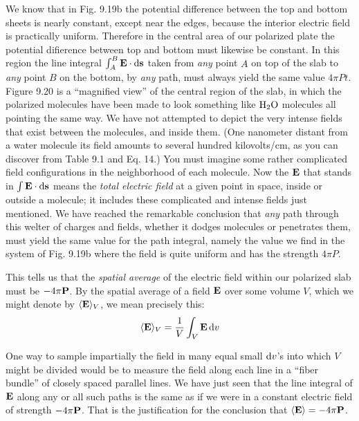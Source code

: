 We know that in Fig. 9.19b the potential difference between the
top and bottom sheets is nearly constant, except near the edges, because
the interior electric field is practically uniform. Therefore in
the central area of our polarized plate the potential difierence between
top and bottom must likewise be constant. In this region the
line integral $\int_A^B\mathbf{E}\cdot\operatorname{d\!}\mathbf{s}$ taken from \emph{any} point $A$ on top of the slab to
\emph{any} point $B$ on the bottom, by \emph{any} path, must always yield the same
value $4\pi Pt$. Figure 9.20 is a ``magnified view'' of the central region
of the slab, in which the polarized molecules have been made to look
something like $\textup{H}_2\textup{O}$ molecules all pointing the same way. We have
not attempted to depict the very intense fields that exist between the
molecules, and inside them. (One nanometer distant from a water
molecule its field amounts to several hundred kilovolts/cm, as you
can discover from Table 9.1 and Eq. 14.) You must imagine some
rather complicated field configurations in the neighborhood of each
molecule. Now the $\mathbf{E}$ that stands in $\int\mathbf{E}\cdot\operatorname{d\!}\mathbf{s}$ means the \emph{total electric
field} at a given point in space, inside or outside a molecule; it includes
these complicated and intense fields just mentioned. We
have reached the remarkable conclusion that \emph{any} path through this
welter of charges and fields, whether it dodges molecules or penetrates
them, must yield the same value for the path integral, namely
the value we find in the system of Fig. 9.19b where the field is quite
uniform and has the strength $4\pi P$.

This tells us that the \emph{spatial average} of the electric field within our
polarized slab must be $-4\pi\mathbf{P}$. By the spatial average of a field $\mathbf{E}$
over some volume $V$, which we might denote by $\langle\mathbf{E}\rangle_V$, we mean
precisely this:
\begin{equation}
  \langle\mathbf{E}\rangle_V = \frac{1}{V}\int_V \mathbf{E}\operatorname{d\!} v
\end{equation}

One way to sample impartially the field in many equal small $\operatorname{d\!} v$'s
into which $V$ might be divided would be to measure the field along
each line in a ``fiber bundle'' of closely spaced parallel lines. We
have just seen that the line integral of $\mathbf{E}$ along any or all such paths
is the same as if we were in a constant electric field of strength $-4\pi\mathbf{P}$.
That is the justification for the conclusion that $\langle\mathbf{E}\rangle=-4\pi\mathbf{P}$.

